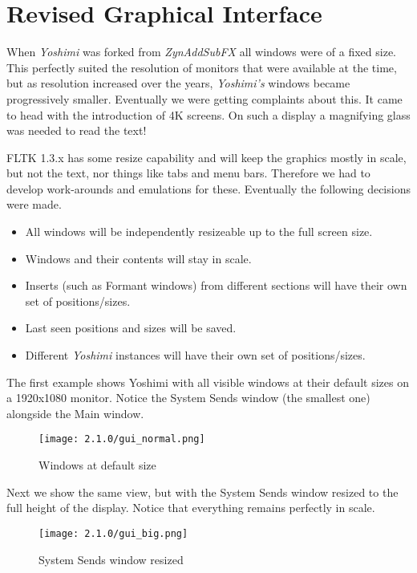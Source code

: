 %
%
%

\section{Revised Graphical Interface}
\label{sec:revised_interface}
   When \textsl{Yoshimi} was forked from \textsl{ZynAddSubFX} all windows were of
   a fixed size. This perfectly suited the resolution of monitors that were
   available at the time, but as resolution increased over the years,
   \textsl{Yoshimi's} windows became progressively smaller. Eventually we were
   getting complaints about this. It came to head with the introduction of 4K
   screens. On such a display a magnifying glass was needed to read the text!

   FLTK 1.3.x has some resize capability and will keep the graphics mostly in
   scale, but not the text, nor things like tabs and menu bars. Therefore we had
   to develop work-arounds and emulations for these. Eventually the following
   decisions were made.
\begin{itemize}
   \item{All windows will be independently resizeable up to the full screen size.}
   \item{Windows and their contents will stay in scale.}
   \item{Inserts (such as Formant windows) from different sections will have
   their own set of positions/sizes.}
   \item{Last seen positions and sizes will be saved.}
   \item{Different \textsl{Yoshimi} instances will have their own set of
   positions/sizes.}
\end{itemize}

\pagebreak
   The first example shows Yoshimi with all visible windows at their default sizes
   on a 1920x1080 monitor. Notice the System Sends window (the smallest one)
   alongside the Main window.
\begin{figure}[H]
   \centering
   \texttt{[image: 2.1.0/gui\_normal.png]}
   \caption{Windows at default size}
   \label{fig:default_size_windows}
\end{figure}
   Next we show the same view, but with the System Sends window resized to the full
   height of the display. Notice that everything remains perfectly in scale.
\begin{figure}[H]
   \centering
   \texttt{[image: 2.1.0/gui\_big.png]}
   \caption{System Sends window resized}
   \label{fig:resized_sends_window}
\end{figure}
